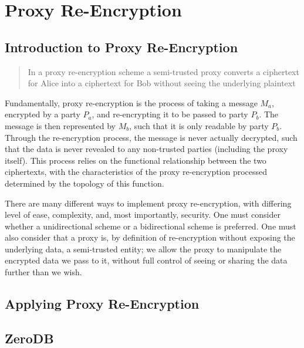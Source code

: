 \section{Proxy Re-Encryption}

\subsection{Introduction to Proxy Re-Encryption}

\blockquote{In a proxy re-encryption scheme a semi-trusted proxy converts a ciphertext for Alice into a ciphertext for Bob without seeing the underlying plaintext}\autocite{greenateniese:2006:article}

Fundamentally, proxy re-encryption is the process of taking a message $M_a$, encrypted by a party $P_a$, and re-encrypting it to be passed to party $P_b$. The message is then represented by $M_b$, such that it is only readable by party $P_b$. Through the re-encryption process, the message is never actually decrypted, such that the data is never revealed to any non-trusted parties (including the proxy itself). This process relies on the functional relationship between the two ciphertexts, with the characteristics of the proxy re-encryption processed determined by the topology of this function.





There are many different ways to implement proxy re-encryption, with differing level of ease, complexity, and, most importantly, security. One must consider whether a unidirectional scheme or a bidirectional scheme is preferred. One must also consider that a proxy is, by definition of re-encryption without exposing the underlying data, a semi-trusted entity; we allow the proxy to manipulate the encrypted data we pass to it, without full control of seeing or sharing the data further than we wish.

\subsection{Applying Proxy Re-Encryption}



\subsection{ZeroDB}
